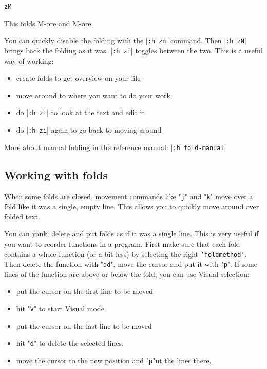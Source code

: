 \begin{Verbatim}[samepage=true]
 zM
\end{Verbatim}

This folds M-ore and M-ore.

You can quickly disable the folding with the |\texttt{:h zn}| command.
Then |\texttt{:h zN}| brings back the folding as it was.
|\texttt{:h zi}| toggles between the two.
This is a useful way of working:

\begin{itemize}
\item create folds to get overview on your file
\item move around to where you want to do your work
\item do |\texttt{:h zi}| to look at the text and edit it
\item do |\texttt{:h zi}| again to go back to moving around
\end{itemize}

More about manual folding in the reference manual: |\texttt{:h fold-manual}|
\subsection{Working with folds}
When some folds are closed, movement commands like "\texttt{j}" and "\texttt{k}" move over a fold like it was a single, empty line.
This allows you to quickly move around over folded text.

You can yank, delete and put folds as if it was a single line.
This is very useful if you want to reorder functions in a program.
First make sure that each fold contains a whole function (or a bit less) by selecting the right \texttt{'foldmethod'}.
Then delete the function with "\texttt{dd}", move the cursor and put it with "\texttt{p}".
If some lines of the function are above or below the fold, you can use Visual selection:

\begin{itemize}
\item put the cursor on the first line to be moved
\item hit "\texttt{V}" to start Visual mode
\item put the cursor on the last line to be moved
\item hit "\texttt{d}" to delete the selected lines.
\item move the cursor to the new position and "\texttt{p}"ut the lines there.
\end{itemize}

